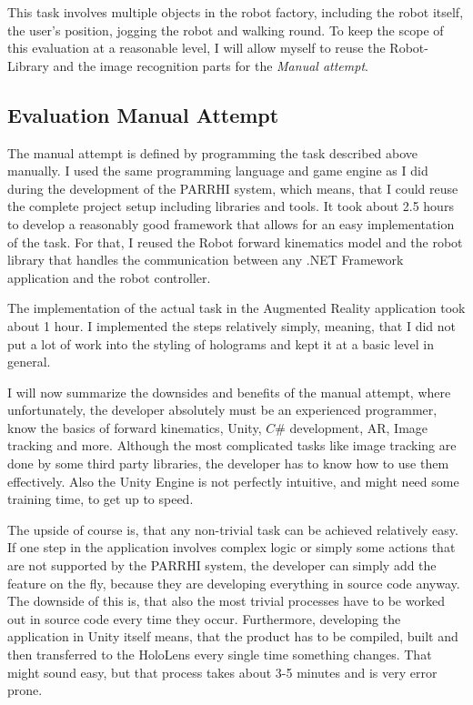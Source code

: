 This task involves multiple objects in the robot factory, including the robot itself, the user's position, jogging the robot and walking round. To keep the scope of this evaluation at a reasonable level, I will allow myself to reuse the Robot-Library and the image recognition parts for the \textit{Manual attempt}. 

\subsection{Evaluation Manual Attempt}

The manual attempt is defined by programming the task described above manually. I used the same programming language and game engine as I did during the development of the PARRHI system, which means, that I could reuse the complete project setup including libraries and tools. It took about 2.5 hours to develop a reasonably good framework that allows for an easy implementation of the task. For that, I reused the Robot forward kinematics model and the robot library that handles the communication between any .NET Framework application and the robot controller. 

The implementation of the actual task in the Augmented Reality application took about 1 hour. I implemented the steps relatively simply, meaning, that I did not put a lot of work into the styling of holograms and kept it at a basic level in general.

I will now summarize the downsides and benefits of the manual attempt, where unfortunately, the developer absolutely must be an experienced programmer, know the basics of forward kinematics, Unity, $C\#$ development, AR, Image tracking and more. Although the most complicated tasks like image tracking are done by some third party libraries, the developer has to know how to use them effectively. Also the Unity Engine is not perfectly intuitive, and might need some training time, to get up to speed.

The upside of course is, that any non-trivial task can be achieved relatively easy. If one step in the application involves complex logic or simply some actions that are not supported by the PARRHI system, the developer can simply add the feature on the fly, because they are developing everything in source code anyway. The downside of this is, that also the most trivial processes have to be worked out in source code every time they occur. Furthermore, developing the application in Unity itself means, that the product has to be compiled, built and then transferred to the HoloLens every single time something changes. That might sound easy, but that process takes about 3-5 minutes and is very error prone.

